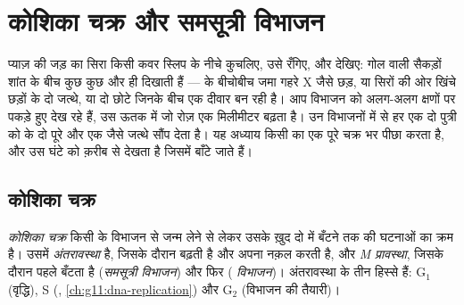 \chapter{कोशिका चक्र और समसूत्री विभाजन}\label{ch:g11:cell-cycle-mitosis}

प्याज़ की जड़ का सिरा किसी कवर स्लिप के नीचे कुचलिए, उसे रँगिए, और
देखिए: गोल  वाली सैकड़ों शांत  के बीच कुछ  कुछ और
ही दिखाती हैं ---  के बीचोबीच जमा गहरे X जैसे छड़, या सिरों की ओर
खिंचे छड़ों के दो जत्थे, या दो छोटे  जिनके बीच एक दीवार बन रही
है। आप  विभाजन को अलग-अलग क्षणों पर पकड़े हुए देख रहे हैं, उस ऊतक
में जो रोज़ एक मिलीमीटर बढ़ता है। उन विभाजनों में से हर एक दो पुत्री
 को  के दो पूरे और एक जैसे जत्थे सौंप देता है। यह अध्याय
किसी  का एक पूरे चक्र भर पीछा करता है, और उस घंटे को क़रीब से देखता
है जिसमें  बाँटे जाते हैं।

\section{कोशिका चक्र}

\begin{definition}[कोशिका चक्र]\label{def:g11:cell-cycle-mitosis:cycle}
\emph{कोशिका चक्र} किसी  के विभाजन से जन्म लेने
से लेकर उसके ख़ुद दो में बँटने तक की घटनाओं का क्रम है। उसमें
\emph{अंतरावस्था} है, जिसके दौरान  बढ़ती है और अपना  नक़ल करती
है, और \emph{M प्रावस्था}, जिसके दौरान पहले  बँटता है
(\emph{समसूत्री विभाजन}) और फिर 
(\emph{ विभाजन})। अंतरावस्था के तीन हिस्से हैं:
$\mathrm{G_1}$ (वृद्धि), S (,
\cref{ch:g11:dna-replication}) और $\mathrm{G_2}$ (विभाजन की तैयारी)।
\end{definition}

